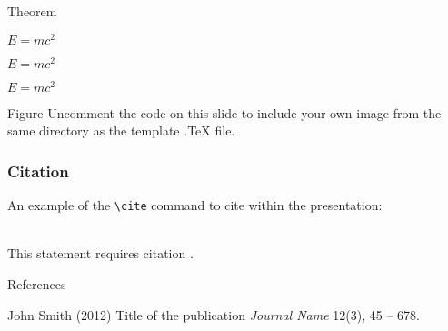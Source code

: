 \documentclass[aspectratio=169,xcolor=dvipsnames]{beamer}
\begin{document}
\begin{frame}{Theorem}
    \begin{theorem}
        $E = mc^2$
    \end{theorem}

	\begin{theorem}
		$E = mc^2$
	\end{theorem}

	\begin{theorem}
		$E = mc^2$
	\end{theorem}

\end{frame}


\begin{frame}{Figure}
    Uncomment the code on this slide to include your own image from the same directory as the template .TeX file.
\end{frame}


\begin{frame}[fragile] %
    \frametitle{Citation}
    An example of the \verb|\cite| command to cite within the presentation:\\~

    This statement requires citation \cite{p1}.
\end{frame}


\begin{frame}{References}
    \footnotesize{
        \begin{thebibliography}{99}
             John Smith (2012)
            \newblock Title of the publication
            \newblock \emph{Journal Name} 12(3), 45 -- 678.
        \end{thebibliography}
    }
\end{frame}

\end{document}
